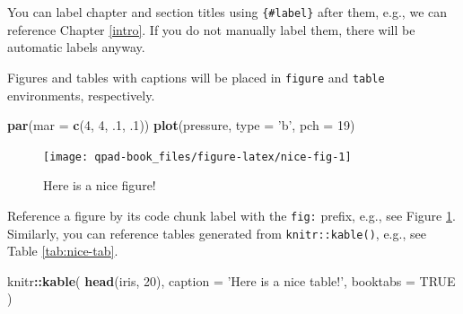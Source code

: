 \documentclass[12pt,]{book}
\newenvironment{Shaded}{\begin{snugshade}}{\end{snugshade}}
\newcommand{\DataTypeTok}[1]{\textcolor[rgb]{0.13,0.29,0.53}{#1}}
\newcommand{\DecValTok}[1]{\textcolor[rgb]{0.00,0.00,0.81}{#1}}
\newcommand{\FloatTok}[1]{\textcolor[rgb]{0.00,0.00,0.81}{#1}}
\newcommand{\KeywordTok}[1]{\textcolor[rgb]{0.13,0.29,0.53}{\textbf{#1}}}
\newcommand{\NormalTok}[1]{#1}
\newcommand{\OperatorTok}[1]{\textcolor[rgb]{0.81,0.36,0.00}{\textbf{#1}}}
\newcommand{\OtherTok}[1]{\textcolor[rgb]{0.56,0.35,0.01}{#1}}
\newcommand{\StringTok}[1]{\textcolor[rgb]{0.31,0.60,0.02}{#1}}
\begin{document}
You can label chapter and section titles using \texttt{\{\#label\}} after them, e.g., we can reference Chapter \ref{intro}. If you do not manually label them, there will be automatic labels anyway.

Figures and tables with captions will be placed in \texttt{figure} and \texttt{table} environments, respectively.

\begin{Shaded}
\begin{Highlighting}[]
\KeywordTok{par}\NormalTok{(}\DataTypeTok{mar =} \KeywordTok{c}\NormalTok{(}\DecValTok{4}\NormalTok{, }\DecValTok{4}\NormalTok{, }\FloatTok{.1}\NormalTok{, }\FloatTok{.1}\NormalTok{))}
\KeywordTok{plot}\NormalTok{(pressure, }\DataTypeTok{type =} \StringTok{'b'}\NormalTok{, }\DataTypeTok{pch =} \DecValTok{19}\NormalTok{)}
\end{Highlighting}
\end{Shaded}

\begin{figure}

{\centering \texttt{[image: qpad-book\_files/figure-latex/nice-fig-1]} 

}

\caption{Here is a nice figure!}\label{fig:nice-fig}
\end{figure}

Reference a figure by its code chunk label with the \texttt{fig:} prefix, e.g., see Figure \ref{fig:nice-fig}. Similarly, you can reference tables generated from \texttt{knitr::kable()}, e.g., see Table \ref{tab:nice-tab}.

\begin{Shaded}
\begin{Highlighting}[]
\NormalTok{knitr}\OperatorTok{::}\KeywordTok{kable}\NormalTok{(}
  \KeywordTok{head}\NormalTok{(iris, }\DecValTok{20}\NormalTok{), }\DataTypeTok{caption =} \StringTok{'Here is a nice table!'}\NormalTok{,}
  \DataTypeTok{booktabs =} \OtherTok{TRUE}
\NormalTok{)}
\end{Highlighting}
\end{Shaded}
\end{document}
